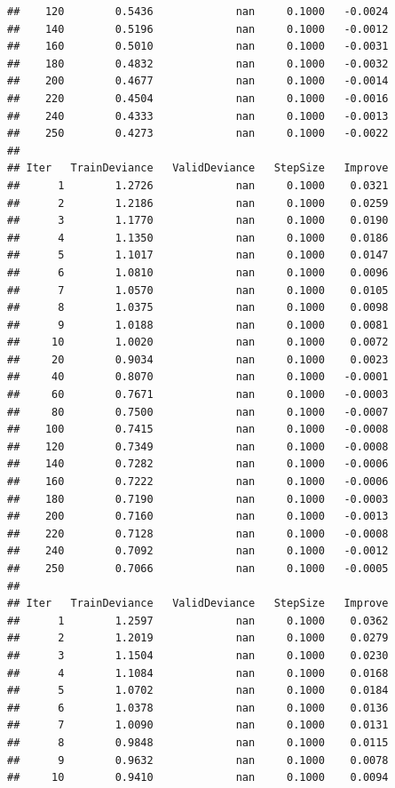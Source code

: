 \documentclass[
]{book}
\begin{document}
\begin{verbatim}
##    120        0.5436             nan     0.1000   -0.0024
##    140        0.5196             nan     0.1000   -0.0012
##    160        0.5010             nan     0.1000   -0.0031
##    180        0.4832             nan     0.1000   -0.0032
##    200        0.4677             nan     0.1000   -0.0014
##    220        0.4504             nan     0.1000   -0.0016
##    240        0.4333             nan     0.1000   -0.0013
##    250        0.4273             nan     0.1000   -0.0022
## 
## Iter   TrainDeviance   ValidDeviance   StepSize   Improve
##      1        1.2726             nan     0.1000    0.0321
##      2        1.2186             nan     0.1000    0.0259
##      3        1.1770             nan     0.1000    0.0190
##      4        1.1350             nan     0.1000    0.0186
##      5        1.1017             nan     0.1000    0.0147
##      6        1.0810             nan     0.1000    0.0096
##      7        1.0570             nan     0.1000    0.0105
##      8        1.0375             nan     0.1000    0.0098
##      9        1.0188             nan     0.1000    0.0081
##     10        1.0020             nan     0.1000    0.0072
##     20        0.9034             nan     0.1000    0.0023
##     40        0.8070             nan     0.1000   -0.0001
##     60        0.7671             nan     0.1000   -0.0003
##     80        0.7500             nan     0.1000   -0.0007
##    100        0.7415             nan     0.1000   -0.0008
##    120        0.7349             nan     0.1000   -0.0008
##    140        0.7282             nan     0.1000   -0.0006
##    160        0.7222             nan     0.1000   -0.0006
##    180        0.7190             nan     0.1000   -0.0003
##    200        0.7160             nan     0.1000   -0.0013
##    220        0.7128             nan     0.1000   -0.0008
##    240        0.7092             nan     0.1000   -0.0012
##    250        0.7066             nan     0.1000   -0.0005
## 
## Iter   TrainDeviance   ValidDeviance   StepSize   Improve
##      1        1.2597             nan     0.1000    0.0362
##      2        1.2019             nan     0.1000    0.0279
##      3        1.1504             nan     0.1000    0.0230
##      4        1.1084             nan     0.1000    0.0168
##      5        1.0702             nan     0.1000    0.0184
##      6        1.0378             nan     0.1000    0.0136
##      7        1.0090             nan     0.1000    0.0131
##      8        0.9848             nan     0.1000    0.0115
##      9        0.9632             nan     0.1000    0.0078
##     10        0.9410             nan     0.1000    0.0094

\end{verbatim}
\end{document}
